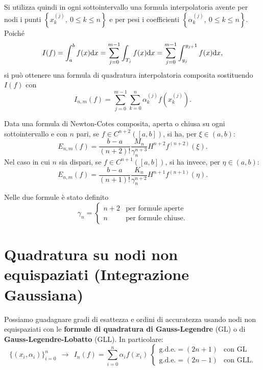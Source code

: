 Si utilizza quindi in ogni sottointervallo una formula interpolatoria avente per nodi i punti $\left\{x^{(j)}_{k} ,\ 0\leqslant k\leqslant n\right\}$ e per pesi i coefficienti $\left\{\alpha ^{(j)}_{k} ,\ 0\leqslant k\leqslant n\right\}$. Poiché
\begin{equation*}
I(f) =\int ^{b}_{a} f(x) \mathrm d x=\sum\limits ^{m-1}_{j=0}\int\nolimits _{T_{j}} f(x) \mathrm d x=\sum\limits ^{m-1}_{j=0}\int\nolimits ^{y_{j+} 1}_{y_{j}} f(x) \mathrm d x,
\end{equation*}
si può ottenere una formula di quadratura interpolatoria composita sostituendo $I(f)$ con
\begin{equation*}
I_{n,m}(f) =\sum\limits ^{m-1}_{j=0}\sum\limits ^{n}_{k=0} \alpha ^{(j)}_{k} f\left( x^{(j)}_{k}\right).
\end{equation*}
\begin{theorem}
Data una formula di Newton-Cotes composita, aperta o chiusa su ogni sottointervallo e con $n$ pari, se $f\in C^{n+2}([ a,b])$, si ha, per $\xi \in ( a,b)$:
\begin{equation*}
E_{n,m}(f) =\frac{b-a}{( n+2) !}\frac{M_{n}}{\gamma ^{n+3}_{n}} H^{n+2} f^{( n+2)}( \xi ).
\end{equation*}
Nel caso in cui $n$ sia dispari, se $f\in C^{n+1}([ a,b])$, si ha invece, per $\eta \in ( a,b)$:
\begin{equation*}
E_{n,m}(f) =\frac{b-a}{( n+1) !}\frac{K_{n}}{\gamma ^{n+2}_{n}} H^{n+1} f^{( n+1)}( \eta ).
\end{equation*}

Nelle due formule è stato definito
\begin{equation*}
\gamma _{n} =\begin{cases}
n+2 & \text{per formule aperte}\\
n & \text{per formule chiuse}.
\end{cases}
\end{equation*}
\end{theorem}

\section{Quadratura su nodi non equispaziati (Integrazione Gaussiana)}
\label{sec:integrazione-gaussiana}

Possiamo guadagnare gradi di esattezza e ordini di accuratezza usando nodi non equispaziati con le \textbf{formule di quadratura di Gauss-Legendre} (GL) o di \textbf{Gauss-Legendre-Lobatto} (GLL).
In particolare:
\begin{equation*}
\{( x_{i} ,\alpha _{i})\}^{n}_{i=0} \ \ \rightarrow \ \ I_{n}(f) =\sum\limits ^{n}_{i=0} \alpha _{i} f( x_{i}) \ \begin{cases}
\text{g.d.e.} =( 2n+1) & \text{con GL}\\
\text{g.d.e.} =( 2n-1) & \text{con GLL.}
\end{cases}
\end{equation*}
